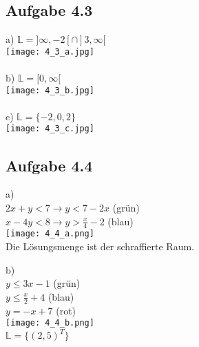 \documentclass{standalone}
\begin{document}
\subsection{Aufgabe 4.3}
a) $\mathbb{L} = ]\infty, -2[ \cap ]3, \infty[$\\
\texttt{[image: 4\_3\_a.jpg]}\\ \\
b) $\mathbb{L} = [0, \infty[$\\
\texttt{[image: 4\_3\_b.jpg]}\\ \\
c) $\mathbb{L} = \{-2, 0, 2\}$\\
\texttt{[image: 4\_3\_c.jpg]}\\

\subsection{Aufgabe 4.4}
a)\\
$2x+y<7 \rightarrow y < 7 -2x$ (grün)\\
$x-4y < 8 \rightarrow y > \frac{x}{4} - 2$ (blau)\\
\texttt{[image: 4\_4\_a.png]}\\
Die Lösungsmenge ist der schraffierte Raum.
\newpage

\noindent b)\\
$ y \leq 3x-1$ (grün)\\
$ y \leq \frac{x}{2} + 4$ (blau)\\
$ y = -x + 7$ (rot)\\
\texttt{[image: 4\_4\_b.png]}\\
$\mathbb{L} =\{(2, 5)^T\}$\\
\end{document}
